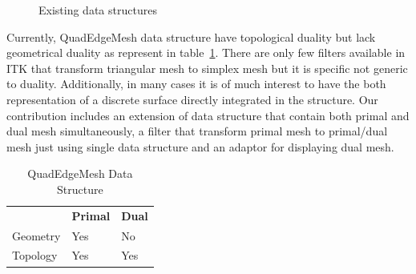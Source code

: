\documentclass{InsightArticle}
\begin{document}
\begin{figure}
	\centering
	\caption{Existing data structures}
	\label{fig:QuadEdgeMeshStructure}
\end{figure}
Currently, QuadEdgeMesh data structure have topological duality but lack geometrical duality as represent in table~\ref{table:existingStructure}. There are only few filters available in ITK that transform triangular mesh to simplex mesh but it is specific not generic to duality. Additionally, in many cases it is of much interest to have the both representation of a discrete surface directly integrated in the structure. Our contribution includes an extension of data structure that contain both primal and dual mesh simultaneously, a filter that transform primal mesh to primal/dual mesh just using single data structure and an adaptor for displaying dual mesh.
\begin{table}
	\begin{center}
		\caption{QuadEdgeMesh Data Structure}
		\label{table:existingStructure}
		\begin{tabular}{ p{3cm} p{3cm} p{3cm} }
			\hline	
			\noalign{\smallskip} 
			{\bf  }	& {\bf Primal} & {\bf Dual} \\
			\noalign{\smallskip}	
			\hline  	
			\noalign{\smallskip}
			Geometry & Yes & No \\ 
			Topology & Yes & Yes \\ 
			\hline
	\end{tabular}
	\end{center}
\end{table}
\end{document}
